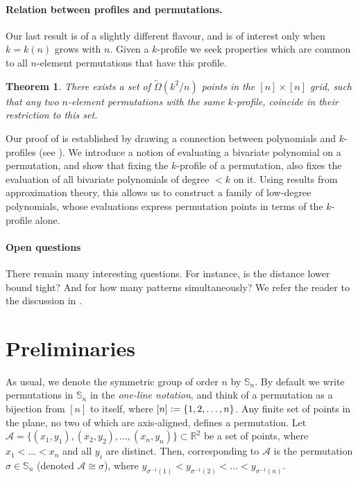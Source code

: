 \documentclass{article}
\newcommand{\Sn}{\mathbb{S}_n}
\newcommand{\RR}{\mathbb{R}}
\newcommand{\eqdef}{\vcentcolon=}
\theoremstyle{remark}
\theoremstyle{plain}
\newtheorem{thm}{Theorem}
\begin{document}
\paragraph{Relation between profiles and permutations.} Our last result is of a slightly different flavour,
and is of interest only when $k=k(n)$ grows with $n$. Given a $k$-profile we seek properties which are
common to all $n$-element permutations that have this profile.

\begin{thm}
    \label{thm_perm_to_points}
    There exists a set of $\widetilde{\Omega}(k^2/n)$ points in the $[n] \times [n]$ grid, 
    such that any two $n$-element permutations with the same $k$-profile, coincide in their restriction to this set.
\end{thm}

Our proof of  is established by drawing a connection
between polynomials and $k$-profiles (see ).
We introduce a notion of evaluating a bivariate polynomial on a permutation,
and show that fixing the $k$-profile
of a permutation, also fixes the evaluation of all bivariate polynomials of degree $<k$ on it. 
Using results from approximation theory, this allows us to construct a  
family of low-degree polynomials, whose evaluations express permutation points in terms of the $k$-profile alone. 

\paragraph{Open questions} There remain many interesting questions. For instance, is the distance lower bound tight? And for how many patterns simultaneously? We refer the reader to the discussion in . \section{Preliminaries}

As usual, we denote the symmetric group of order $n$ by $\mathbb{S}_n$.
By default we write permutations in $\mathbb{S}_n$ in the \emph{one-line notation}, and
think of a permutation as a bijection from $[n]$ to itself,
where  $[n] \eqdef \{1, 2, \dots, n\}$.  Any finite set of points in the plane, no two of which are
axis-aligned, defines a permutation.
Let $\mathcal{A} = \{ (x_1, y_1), (x_2, y_2), \dots, (x_n, y_n) \} \subset \RR^2$ be a set of points,
where $x_1<\ldots<x_n$ and all $y_i$ are distinct. 
Then, corresponding to $\mathcal{A}$ is the permutation $\sigma \in \Sn$ (denoted $\mathcal{A} \cong \sigma$), where $y_{\sigma^{-1}(1)} < y_{\sigma^{-1}(2)} < \dots < y_{\sigma^{-1}(n)}$.
\end{document}
